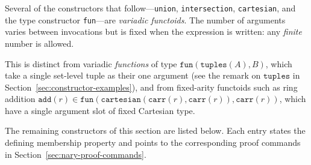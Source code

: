 \begin{remark}
Several of the constructors that follow---\texttt{union},
\texttt{intersection}, \texttt{cartesian}, and the type constructor
\texttt{fun}---are \emph{variadic functoids}.  The number of arguments
varies between invocations but is fixed when the expression is written:
any \emph{finite} number is allowed.

This is distinct from variadic \emph{functions} of type
$\mathtt{fun}(\mathtt{tuples}(A), B)$, which take a single set-level
tuple as their one argument (see the remark on $\mathtt{tuples}$ in
Section~\ref{sec:constructor-examples}), and from fixed-arity functoids
such as ring addition
$\mathtt{add}(r) \in \mathtt{fun}(\mathtt{cartesian}(\mathtt{carr}(r), \mathtt{carr}(r)), \mathtt{carr}(r))$,
which have a single argument slot of fixed Cartesian type.
\end{remark}

\medskip\noindent The remaining constructors of this section are listed
below.  Each entry states the defining membership property and points to
the corresponding proof commands in
Section~\ref{sec:nary-proof-commands}.

